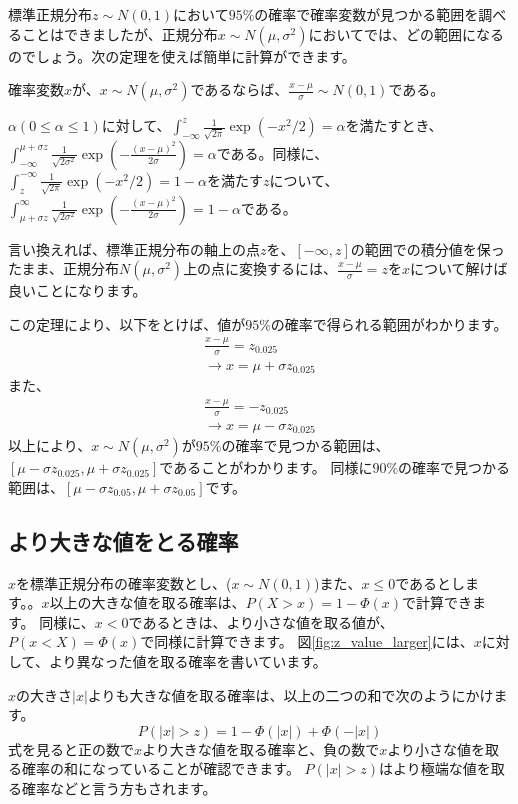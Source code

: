 標準正規分布$z\sim N(0,1)$において$95\%$の確率で確率変数が見つかる範囲を調べることはできましたが、正規分布$x\sim N(\mu,\sigma^2)$においてでは、どの範囲になるのでしょう。次の定理を使えば簡単に計算ができます。
\begin{theo}
    確率変数$x$が、$x\sim N(\mu,\sigma^2)$であるならば、$\frac{x-\mu}{\sigma}\sim N(0,1)$である。    
\end{theo}
\begin{theo}
$\alpha(0\leq \alpha\leq 1)$に対して、$\int_{-\infty}^{z}\frac{1}{\sqrt{2\pi}}\exp(-x^2/2)=\alpha$を満たすとき、$\int_{-\infty}^{\mu+\sigma z} \frac{1}{\sqrt{2\sigma^2}}\exp(-\frac{(x-\mu)^2}{2\sigma})=\alpha$である。同様に、$\int_{z}^{-\infty}\frac{1}{\sqrt{2\pi}}\exp(-x^2/2)=1-\alpha$を満たす$z$について、$\int_{\mu+\sigma z}^{\infty} \frac{1}{\sqrt{2\sigma^2}}\exp(-\frac{(x-\mu)^2}{2\sigma})=1-\alpha$である。
\end{theo}
言い換えれば、標準正規分布の軸上の点$z$を、$[-\infty,z]$の範囲での積分値を保ったまま、正規分布$N(\mu,\sigma^2)$上の点に変換するには、$\frac{x-\mu}{\sigma}=z$を$x$について解けば良いことになります。

この定理により、以下をとけば、値が$95\%$の確率で得られる範囲がわかります。
\begin{eqnarray*}
    \frac{x-\mu}{\sigma}=z_{0.025}\\
    \rightarrow x = \mu+\sigma z_{0.025}
\end{eqnarray*}
また、
\begin{eqnarray*}
    \frac{x-\mu}{\sigma}=-z_{0.025}\\
    \rightarrow x = \mu-\sigma z_{0.025}
\end{eqnarray*}
以上により、$x \sim N(\mu,\sigma^2)$が$95\%$の確率で見つかる範囲は、$[\mu-\sigma z_{0.025},\mu+\sigma z_{0.025}]$であることがわかります。
同様に$90\%$の確率で見つかる範囲は、$[\mu-\sigma z_{0.05},\mu+\sigma z_{0.05}]$です。

\subsection{より大きな値をとる確率}
$x$を標準正規分布の確率変数とし、($x\sim N(0,1)$)また、$x\leq 0$であるとします。。$x$以上の大きな値を取る確率は、$P(X>x)=1-\varPhi(x)$で計算できます。
同様に、$x < 0$であるときは、より小さな値を取る値が、$P(x<X)=\varPhi(x)$で同様に計算できます。
図\ref{fig:z_value_larger}には、$x$に対して、より異なった値を取る確率を書いています。

$x$の大きさ$|x|$よりも大きな値を取る確率は、以上の二つの和で次のようにかけます。
\begin{equation}
    P(|x|>z) = 1-\varPhi(|x|)+\varPhi(-|x|)
\end{equation}
式を見ると正の数で$x$より大きな値を取る確率と、負の数で$x$より小さな値を取る確率の和になっていることが確認できます。
$P(|x|>z)$はより極端な値を取る確率などと言う方もされます。

